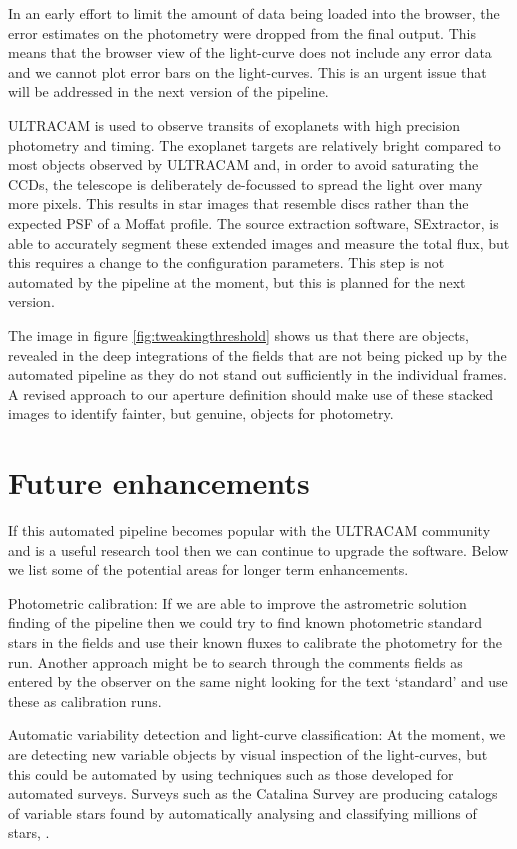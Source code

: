 In an early effort to limit the amount of data being loaded into the browser, the error estimates on the photometry were dropped from the final output. This means that the browser view of the light-curve does not include any error data and we cannot plot error bars on the light-curves. This is an urgent issue that will be addressed in the next version of the pipeline. 

ULTRACAM is used to observe transits of exoplanets with high precision photometry and timing. The exoplanet targets are relatively bright compared to most objects observed by ULTRACAM and, in order to avoid saturating the CCDs, the telescope is deliberately de-focussed to spread the light over many more pixels. This results in star images that resemble discs rather than the expected PSF of a Moffat profile. The source extraction software, SExtractor, is able to accurately segment these extended images and measure the total flux, but this requires a change to the configuration parameters. This step is not automated by the pipeline at the moment, but this is planned for the next version. 

The image in figure \ref{fig:tweakingthreshold} shows us that there are objects, revealed in the deep integrations of the fields that are not being picked up by the automated pipeline as they do not stand out sufficiently in the individual frames. A revised approach to our aperture definition should make use of these stacked images to identify fainter, but genuine, objects for photometry. 

\section{Future enhancements}
If this automated pipeline becomes popular with the ULTRACAM community and is a useful research tool then we can continue to upgrade the software. Below we list some of the potential areas for longer term enhancements.

{Photometric calibration}: If we are able to improve the astrometric solution finding of the pipeline then we could try to find known photometric standard stars in the fields and use their known fluxes to calibrate the photometry for the run. Another approach might be to search through the comments fields as entered by the observer on the same night looking for the text `standard' and use these as calibration runs. 

{Automatic variability detection and light-curve classification}: At the moment, we are detecting new variable objects by visual inspection of the light-curves, but this could be automated by using techniques such as those developed for automated surveys. Surveys such as the Catalina Survey are producing catalogs of variable stars found by automatically analysing and classifying millions of stars, \citep{CatalinaCatalog}.

